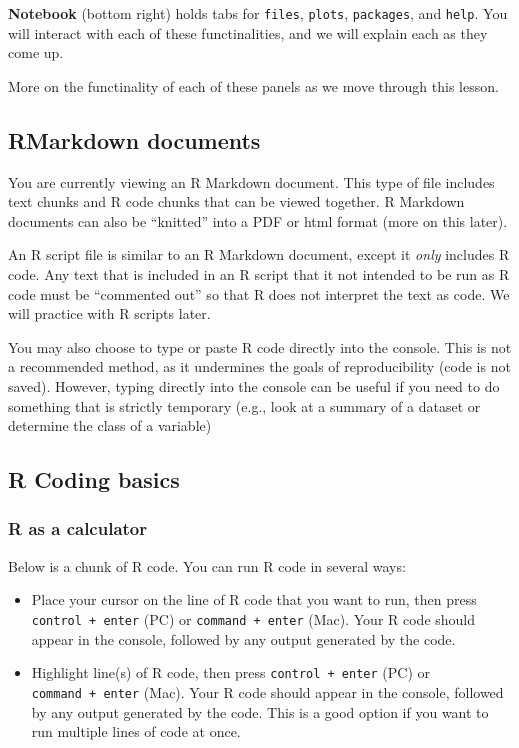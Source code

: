 \documentclass[
]{article}
\begin{document}
\textbf{Notebook} (bottom right) holds tabs for \texttt{files},
\texttt{plots}, \texttt{packages}, and \texttt{help}. You will interact
with each of these functinalities, and we will explain each as they come
up.

More on the functinality of each of these panels as we move through this
lesson.

\hypertarget{rmarkdown-documents}{%
\subsection{RMarkdown documents}\label{rmarkdown-documents}}

You are currently viewing an R Markdown document. This type of file
includes text chunks and R code chunks that can be viewed together. R
Markdown documents can also be ``knitted'' into a PDF or html format
(more on this later).

An R script file is similar to an R Markdown document, except it
\emph{only} includes R code. Any text that is included in an R script
that it not intended to be run as R code must be ``commented out'' so
that R does not interpret the text as code. We will practice with R
scripts later.

You may also choose to type or paste R code directly into the console.
This is not a recommended method, as it undermines the goals of
reproducibility (code is not saved). However, typing directly into the
console can be useful if you need to do something that is strictly
temporary (e.g., look at a summary of a dataset or determine the class
of a variable)

\hypertarget{r-coding-basics}{%
\subsection{R Coding basics}\label{r-coding-basics}}

\hypertarget{r-as-a-calculator}{%
\subsubsection{R as a calculator}\label{r-as-a-calculator}}

Below is a chunk of R code. You can run R code in several ways:

\begin{itemize}
\item
  Place your cursor on the line of R code that you want to run, then
  press \texttt{control\ +\ enter} (PC) or \texttt{command\ +\ enter}
  (Mac). Your R code should appear in the console, followed by any
  output generated by the code.
\item
  Highlight line(s) of R code, then press \texttt{control\ +\ enter}
  (PC) or \texttt{command\ +\ enter} (Mac). Your R code should appear in
  the console, followed by any output generated by the code. This is a
  good option if you want to run multiple lines of code at once.
\end{itemize}
\end{document}
